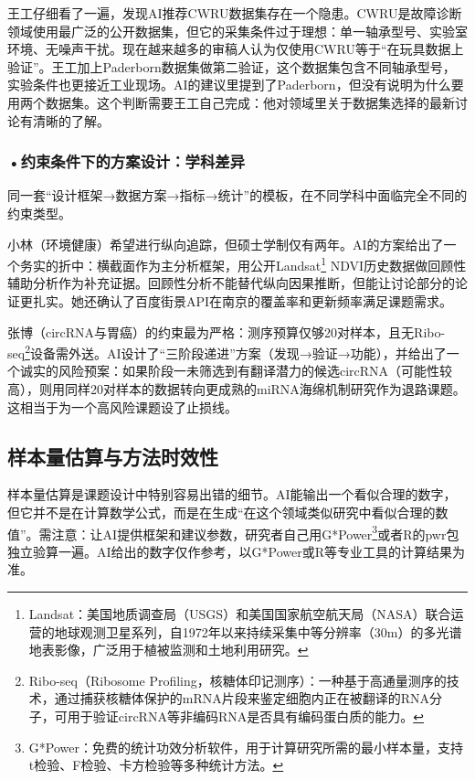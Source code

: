 \begin{critiquebox}
王工仔细看了一遍，发现AI推荐CWRU数据集存在一个隐患。CWRU是故障诊断领域使用最广泛的公开数据集，但它的采集条件过于理想：单一轴承型号、实验室环境、无噪声干扰。现在越来越多的审稿人认为仅使用CWRU等于``在玩具数据上验证''。王工加上Paderborn数据集做第二验证，这个数据集包含不同轴承型号，实验条件也更接近工业现场。AI的建议里提到了Paderborn，但没有说明为什么要用两个数据集。这个判断需要王工自己完成：他对领域里关于数据集选择的最新讨论有清晰的了解。
\end{critiquebox}

\smallskip
\subsubsection*{\textbf{•约束条件下的方案设计：学科差异}}同一套``设计框架→数据方案→指标→统计''的模板，在不同学科中面临完全不同的约束类型。

小林（环境健康）希望进行纵向追踪，但硕士学制仅有两年。AI的方案给出了一个务实的折中：横截面作为主分析框架，用公开Landsat\footnote{Landsat：美国地质调查局（USGS）和美国国家航空航天局（NASA）联合运营的地球观测卫星系列，自1972年以来持续采集中等分辨率（30m）的多光谱地表影像，广泛用于植被监测和土地利用研究。} NDVI历史数据做回顾性辅助分析作为补充证据。回顾性分析不能替代纵向因果推断，但能让讨论部分的论证更扎实。她还确认了百度街景API在南京的覆盖率和更新频率满足课题需求。

张博（circRNA与胃癌）的约束最为严格：测序预算仅够20对样本，且无Ribo-seq\footnote{Ribo-seq（Ribosome Profiling，核糖体印记测序）：一种基于高通量测序的技术，通过捕获核糖体保护的mRNA片段来鉴定细胞内正在被翻译的RNA分子，可用于验证circRNA等非编码RNA是否具有编码蛋白质的能力。}设备需外送。AI设计了``三阶段递进''方案（发现→验证→功能），并给出了一个诚实的风险预案：如果阶段一未筛选到有翻译潜力的候选circRNA（可能性较高），则用同样20对样本的数据转向更成熟的miRNA海绵机制研究作为退路课题。这相当于为一个高风险课题设了止损线。


\subsection{样本量估算与方法时效性}

样本量估算是课题设计中特别容易出错的细节。AI能输出一个看似合理的数字，但它并不是在计算数学公式，而是在生成``在这个领域类似研究中看似合理的数值''。需注意：让AI提供框架和建议参数，研究者自己用G*Power\footnote{G*Power：免费的统计功效分析软件，用于计算研究所需的最小样本量，支持t检验、F检验、卡方检验等多种统计方法。}或者R的pwr包独立验算一遍。AI给出的数字仅作参考，以G*Power或R等专业工具的计算结果为准。

